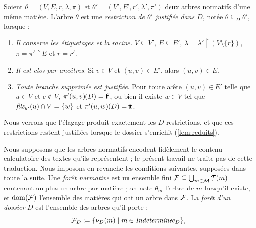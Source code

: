 \documentclass[review]{jflart}
\begin{document}
\begin{defi}[$D$-Restriction]\label{def:D-restriction}
Soient
$\theta=(V,E,r,\lambda,\pi)$ et
$\theta'=(V',E',r',\lambda',\pi')$
deux arbres normatifs d'une même matière.
L'arbre $\theta$ est une \emph{restriction de $\theta'$
justifiée dans $D$}, notée $\theta\subseteq_D\theta'$,
lorsque :
\begin{enumerate}
\item \emph{Il conserve les étiquetages et la racine.}
$V\subseteq V'$, $E\subseteq E'$,
$\lambda=\lambda'\!\upharpoonright(V\setminus\{r\})$,
$\pi=\pi'\!\upharpoonright E$ et $r=r'$.
\item \emph{Il est clos par ancêtres.}
Si $v\in V$ et $(u,v)\in E'$, alors $(u,v)\in E$.
\item \emph{Toute branche supprimée est justifiée.}
Pour toute arête $(u,v)\in E'$ telle que $u\in V$ et $v\notin V$,
$\pi'(u,v)(D)={\mathsf{f\!f}}$, ou bien il existe $w\in V$ tel que
$\mathit{fils}_{\theta'}(u)\cap V=\{w\}$ et $\pi'(u,w)(D)={\mathsf{t\!t}}$.
\end{enumerate}
Nous verrons que l'élagage produit exactement les
$D$-restrictions, et que ces restrictions restent justifiées
lorsque le dossier s'enrichit (\autoref{lem:reduits}).
\end{defi}
Nous supposons que les arbres normatifs encodent fidèlement le contenu
calculatoire des textes qu'ils représentent ; le présent travail ne traite pas
de cette traduction. Nous imposons en revanche les conditions suivantes,
supposées dans toute la suite. Une \emph{forêt normative} est un ensemble fini
\(\mathcal{F}\subseteq\bigcup_{m\in\mathcal{M}}\mathcal{T}(m)\) contenant au plus un arbre par
matière ; on note \(\theta_m\) l'arbre de \(m\) lorsqu'il existe, et
\(\mathrm{dom}(\mathcal{F})\) l'ensemble des matières qui ont un arbre dans
\(\mathcal{F}\). La \emph{forêt d'un dossier} \(D\) est l'ensemble des arbres qu'il
porte :
\[
 \mathcal{F}_D:=\{\nu_D(m)\mid m\in\mathit{Indeterminee}_D\},
\]
\end{document}
